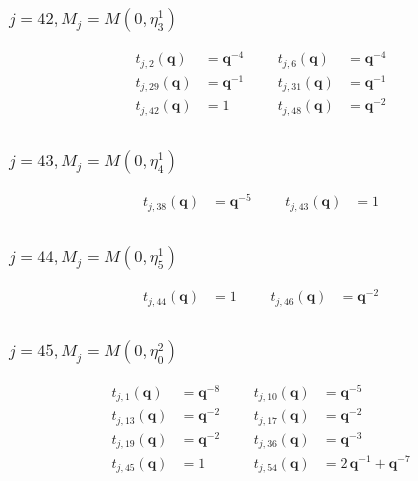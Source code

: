 \subsubsection{$j=42, M_{j}=M(0,\eta^{1}_{3})$}
\begin{align*}
t_{j,2}(\boldsymbol{q})&=\boldsymbol{q}^{-4} &&& t_{j,6}(\boldsymbol{q})&=\boldsymbol{q}^{-4} \\
t_{j,29}(\boldsymbol{q})&=\boldsymbol{q}^{-1} &&& t_{j,31}(\boldsymbol{q})&=\boldsymbol{q}^{-1} \\
t_{j,42}(\boldsymbol{q})&=1 &&& t_{j,48}(\boldsymbol{q})&=\boldsymbol{q}^{-2} \\
\end{align*}

\subsubsection{$j=43, M_{j}=M(0,\eta^{1}_{4})$}
\begin{align*}
t_{j,38}(\boldsymbol{q})&=\boldsymbol{q}^{-5} &&& t_{j,43}(\boldsymbol{q})&=1 \\
\end{align*}

\subsubsection{$j=44, M_{j}=M(0,\eta^{1}_{5})$}
\begin{align*}
t_{j,44}(\boldsymbol{q})&=1 &&& t_{j,46}(\boldsymbol{q})&=\boldsymbol{q}^{-2} \\
\end{align*}

\subsubsection{$j=45, M_{j}=M(0,\eta^{2}_{0})$}
\begin{align*}
t_{j,1}(\boldsymbol{q})&=\boldsymbol{q}^{-8} &&& t_{j,10}(\boldsymbol{q})&=\boldsymbol{q}^{-5} \\
t_{j,13}(\boldsymbol{q})&=\boldsymbol{q}^{-2} &&& t_{j,17}(\boldsymbol{q})&=\boldsymbol{q}^{-2} \\
t_{j,19}(\boldsymbol{q})&=\boldsymbol{q}^{-2} &&& t_{j,36}(\boldsymbol{q})&=\boldsymbol{q}^{-3} \\
t_{j,45}(\boldsymbol{q})&=1 &&& t_{j,54}(\boldsymbol{q})&=2\,\boldsymbol{q}^{-1} + \boldsymbol{q}^{-7} \\
\end{align*}

